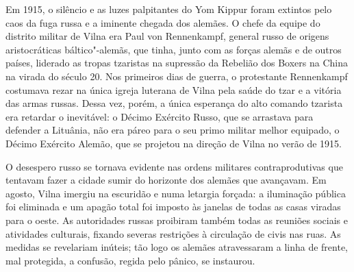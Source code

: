 Em 1915, o silêncio e as luzes palpitantes do Yom Kippur foram extintos
pelo caos da fuga russa e a iminente chegada dos alemães. O chefe da
equipe do distrito militar de Vilna era Paul von Rennenkampf, general
russo de origens aristocráticas báltico"-alemãs, que tinha, junto com as
forças alemãs e de outros países, liderado as tropas tzaristas na
supressão da Rebelião dos Boxers na China na virada do século 20. Nos
primeiros dias de guerra, o protestante Rennenkampf costumava rezar na
única igreja luterana de Vilna pela saúde do tzar e a vitória das armas
russas. Dessa vez, porém, a única esperança do alto comando tzarista era
retardar o inevitável: o Décimo Exército Russo, que se arrastava para
defender a Lituânia, não era páreo para o seu primo militar melhor
equipado, o Décimo Exército Alemão, que se projetou na direção de Vilna
no verão de 1915.

O desespero russo se tornava evidente nas ordens militares
contraprodutivas que tentavam fazer a cidade sumir do horizonte dos
alemães que avançavam. Em agosto, Vilna imergiu na escuridão e numa
letargia forçada: a iluminação pública foi eliminada e um apagão total
foi imposto às janelas de todas as casas viradas para o oeste. As
autoridades russas proibiram também todas as reuniões sociais e
atividades culturais, fixando severas restrições à circulação de civis
nas ruas. As medidas se revelariam inúteis; tão logo os alemães
atravessaram a linha de frente, mal protegida, a confusão, regida pelo
pânico, se instaurou.

